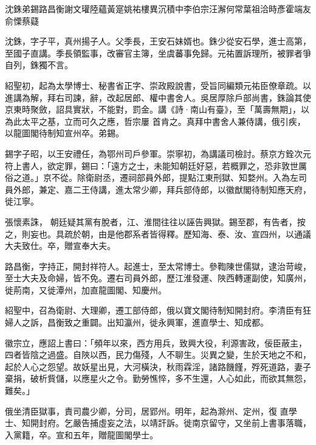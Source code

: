 
\begin{pinyinscope}

 沈銖弟錫路昌衡謝文瓘陸蘊黃寔姚祐樓異沉積中李伯宗汪澥何常葉祖洽時彥霍端友俞慄蔡薿



 沈銖，字子平，真州揚子人。父季長，王安石妹婿也。銖少從安石學，進士高第，至國子直講。季長領監事，改審官主簿，坐虞蕃事免歸。元祐置訴理所，被罪者爭自列，銖獨不言。



 紹聖初，起為太學博士、秘書省正字、崇政殿說書，受旨同編類元祐臣僚章疏。以進講為解，拜右司諫，辭，改起居郎、權中書舍人。吳居厚除戶部尚書，銖論其使京東時聚斂，詔具實狀，不能對，罰金。講《詩·南山有臺》，至「萬壽無期」，以為此太平之基，立而可久之應，哲宗屢
 首肯之。真拜中書舍人兼侍講，俄引疾，以龍圖閣待制知宣州卒。弟錫。



 錫字子昭，以王安禮任，為鄂州司戶參軍。崇寧初，為講議司檢討。蔡京方銓次元符上書人，欲定罪，錫曰：「遠方之士，未能知朝廷好惡，若概罪之，恐非敦世厲俗之道。」京不從。除衛尉丞，遷祠部員外郎，提點江東刑獄、知婺州。入為左司員外郎，兼定、嘉二王侍講，進太常少卿，拜兵部侍郎，以徽猷閣待制知應天府，徙江寧。



 張懷素誅，
 朝廷疑其黨有脫者，江、淮間往往以誣告興獄。錫至郡，有告者，按之，則妄也。具疏於朝，由是他郡系者皆得釋。歷知海、泰、汝、宣四州，以通議大夫致仕。卒，贈宣奉大夫。



 路昌衡，字持正，開封祥符人。起進士，至太常博士。參鞫陳世儒獄，逮治苛峻，至士大夫及命婦，皆不免。遷右司員外郎，歷江淮發運、陜西轉運副使，知廣州，徙荊南，又徙潭州，加直龍圖閣、知慶州。



 紹聖中，召為衛尉、大理卿，遷工部侍郎，俄以寶文閣待制知開封府。李清臣有狂
 婦人之訴，昌衡致之重闢。出知瀛州，徙永興軍，進直學士、知成都。



 徽宗立，應詔上書曰：「頻年以來，西方用兵，致興大役，利源害政，佞臣蔽主，四者皆陰之過盛。自陜以西，民力傷殘，人不聊生。災異之變，生於天地之不和，起於人心之怨望。故妖星出見，大河橫決，秋雨霖淫，諸路饑饉，殍死道路，妻子棄捐，破析貲儲，以應星火之令。勤勞憔悴，多不生還，人心如此，而欲其無怨，難矣。」



 俄坐清臣獄事，責司農少卿，分司，居郢州。明年，起為滁州、定州，復
 直學士、知開封府。乞嚴告捕虛妄之法，以靖訐訴。徙南京留守，又坐前上書事落職，入黨籍，卒。宣和五年，贈龍圖閣學士。




\end{pinyinscope}
